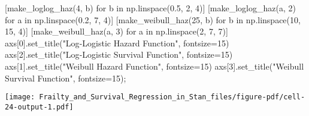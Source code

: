 \documentclass[
  letterpaper,
  DIV=11,
  numbers=noendperiod]{scrartcl}
\newenvironment{Shaded}{\begin{snugshade}}{\end{snugshade}}
\newcommand{\ControlFlowTok}[1]{\textcolor[rgb]{0.00,0.23,0.31}{#1}}
\newcommand{\DecValTok}[1]{\textcolor[rgb]{0.68,0.00,0.00}{#1}}
\newcommand{\FloatTok}[1]{\textcolor[rgb]{0.68,0.00,0.00}{#1}}
\newcommand{\KeywordTok}[1]{\textcolor[rgb]{0.00,0.23,0.31}{#1}}
\newcommand{\NormalTok}[1]{\textcolor[rgb]{0.00,0.23,0.31}{#1}}
\newcommand{\OperatorTok}[1]{\textcolor[rgb]{0.37,0.37,0.37}{#1}}
\newcommand{\StringTok}[1]{\textcolor[rgb]{0.13,0.47,0.30}{#1}}
\begin{document}
\begin{Shaded}
\begin{Highlighting}[]
\NormalTok{[make\_loglog\_haz(}\DecValTok{4}\NormalTok{, b) }\ControlFlowTok{for}\NormalTok{ b }\KeywordTok{in}\NormalTok{ np.linspace(}\FloatTok{0.5}\NormalTok{, }\DecValTok{2}\NormalTok{, }\DecValTok{4}\NormalTok{)]}
\NormalTok{[make\_loglog\_haz(a, }\DecValTok{2}\NormalTok{) }\ControlFlowTok{for}\NormalTok{ a }\KeywordTok{in}\NormalTok{ np.linspace(}\FloatTok{0.2}\NormalTok{, }\DecValTok{7}\NormalTok{, }\DecValTok{4}\NormalTok{)]}
\NormalTok{[make\_weibull\_haz(}\DecValTok{25}\NormalTok{, b) }\ControlFlowTok{for}\NormalTok{ b }\KeywordTok{in}\NormalTok{ np.linspace(}\DecValTok{10}\NormalTok{, }\DecValTok{15}\NormalTok{, }\DecValTok{4}\NormalTok{)]}
\NormalTok{[make\_weibull\_haz(a, }\DecValTok{3}\NormalTok{) }\ControlFlowTok{for}\NormalTok{ a }\KeywordTok{in}\NormalTok{ np.linspace(}\DecValTok{2}\NormalTok{, }\DecValTok{7}\NormalTok{, }\DecValTok{7}\NormalTok{)]}
\NormalTok{axs[}\DecValTok{0}\NormalTok{].set\_title(}\StringTok{"Log{-}Logistic Hazard Function"}\NormalTok{, fontsize}\OperatorTok{=}\DecValTok{15}\NormalTok{)}
\NormalTok{axs[}\DecValTok{2}\NormalTok{].set\_title(}\StringTok{"Log{-}Logistic Survival Function"}\NormalTok{, fontsize}\OperatorTok{=}\DecValTok{15}\NormalTok{)}
\NormalTok{axs[}\DecValTok{1}\NormalTok{].set\_title(}\StringTok{"Weibull Hazard Function"}\NormalTok{, fontsize}\OperatorTok{=}\DecValTok{15}\NormalTok{)}
\NormalTok{axs[}\DecValTok{3}\NormalTok{].set\_title(}\StringTok{"Weibull Survival Function"}\NormalTok{, fontsize}\OperatorTok{=}\DecValTok{15}\NormalTok{)}\OperatorTok{;}
\end{Highlighting}
\end{Shaded}

\texttt{[image: Frailty\_and\_Survival\_Regression\_in\_Stan\_files/figure-pdf/cell-24-output-1.pdf]}
\end{document}
